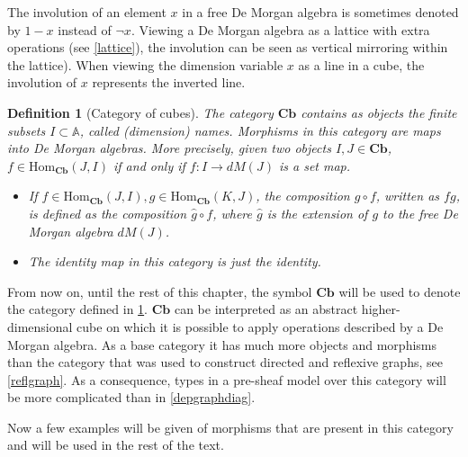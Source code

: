 \documentclass[12pt,a4paper,twoside,xetex]{book} %
\newtheorem{definition}[theorem]{Definition}
\newcommand{\homo}[3]{\text{Hom}_{#1}\left(#2,#3\right)}
\newcommand{\cube}[0]{\textbf{Cb}}
\begin{document}
The involution of an element $x$ in a free De Morgan algebra is sometimes 
denoted by $1-x$ instead  of $\neg x$. Viewing a De Morgan algebra as a lattice with extra operations (see \cref{lattice}), the involution can be seen as vertical mirroring within the lattice). When viewing the dimension variable $x$ as a line in a cube, the involution of $x$ represents the inverted line. 

\begin{definition}[Category of cubes]\label{cubcat}
  The category $\cube$ contains as objects the  finite subsets $I \subset 
\mathbb{A}$, called (dimension) names. Morphisms in this category are maps into 
De Morgan algebras. More precisely, given two objects $I,J \in \cube$, $f 
\in \text{Hom}_{\cube}(J,I)$ if and only if $f: I \rightarrow dM(J)$ is a 
set map.
  \begin{itemize}
  \item  If $f \in \homo{\cube}{J}{I}, g \in \homo{\cube}{K}{J}$, 
the composition $g \circ f$, written as $fg$, is defined as the composition  
$\hat{g} \circ f$, where $\hat{g}$ is the extension of $g$ to the free De 
Morgan algebra $dM(J)$.
    \item The identity map in this category is just the identity.
\end{itemize}
    \end{definition}

From now on, until the rest of this chapter, the symbol $\cube$ will be 
used to denote the category defined in \cref{cubcat}. $\cube$ can be 
interpreted as an abstract higher-dimensional cube on which it is possible to 
apply operations described by a De Morgan algebra. As a base category it has 
much more objects and morphisms than the category that was used to construct 
directed and reflexive graphs, see \cref{reflgraph}. As a consequence, types in 
a pre-sheaf model over this category will be more complicated than in 
\cref{depgraphdiag}.

Now a few examples will be given of morphisms that are present in this category 
and will be used in the rest of the text.
\end{document}
